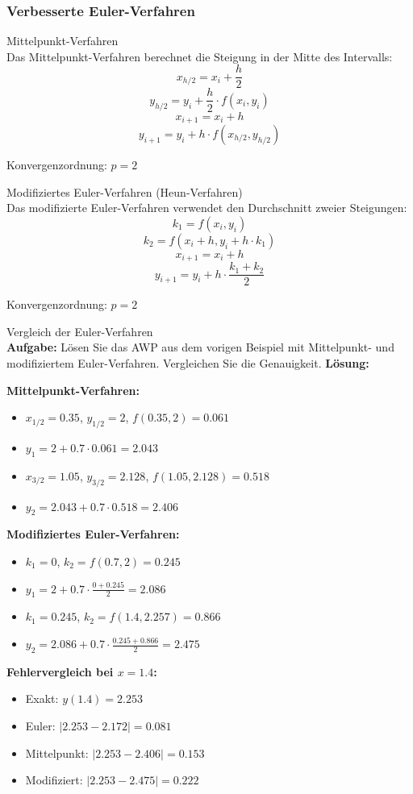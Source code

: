 \subsubsection{Verbesserte Euler-Verfahren}

\begin{theorem}{Mittelpunkt-Verfahren}\\
Das Mittelpunkt-Verfahren berechnet die Steigung in der Mitte des Intervalls:
$$x_{h/2} = x_i + \frac{h}{2}$$
$$y_{h/2} = y_i + \frac{h}{2} \cdot f(x_i, y_i)$$
$$x_{i+1} = x_i + h$$
$$y_{i+1} = y_i + h \cdot f(x_{h/2}, y_{h/2})$$

Konvergenzordnung: $p = 2$
\end{theorem}

\begin{theorem}{Modifiziertes Euler-Verfahren (Heun-Verfahren)}\\
Das modifizierte Euler-Verfahren verwendet den Durchschnitt zweier Steigungen:
$$k_1 = f(x_i, y_i)$$
$$k_2 = f(x_i + h, y_i + h \cdot k_1)$$
$$x_{i+1} = x_i + h$$
$$y_{i+1} = y_i + h \cdot \frac{k_1 + k_2}{2}$$

Konvergenzordnung: $p = 2$
\end{theorem}

\begin{example2}{Vergleich der Euler-Verfahren}\\
\textbf{Aufgabe:} Lösen Sie das AWP aus dem vorigen Beispiel mit Mittelpunkt- und modifiziertem Euler-Verfahren. Vergleichen Sie die Genauigkeit.
\tcblower
\textbf{Lösung:}

\textbf{Mittelpunkt-Verfahren:}
\begin{itemize}
    \item $x_{1/2} = 0.35$, $y_{1/2} = 2$, $f(0.35, 2) = 0.061$
    \item $y_1 = 2 + 0.7 \cdot 0.061 = 2.043$
    \item $x_{3/2} = 1.05$, $y_{3/2} = 2.128$, $f(1.05, 2.128) = 0.518$
    \item $y_2 = 2.043 + 0.7 \cdot 0.518 = 2.406$
\end{itemize}

\textbf{Modifiziertes Euler-Verfahren:}
\begin{itemize}
    \item $k_1 = 0$, $k_2 = f(0.7, 2) = 0.245$
    \item $y_1 = 2 + 0.7 \cdot \frac{0 + 0.245}{2} = 2.086$
    \item $k_1 = 0.245$, $k_2 = f(1.4, 2.257) = 0.866$
    \item $y_2 = 2.086 + 0.7 \cdot \frac{0.245 + 0.866}{2} = 2.475$
\end{itemize}

\textbf{Fehlervergleich bei $x = 1.4$:}
\begin{itemize}
    \item Exakt: $y(1.4) = 2.253$
    \item Euler: $|2.253 - 2.172| = 0.081$
    \item Mittelpunkt: $|2.253 - 2.406| = 0.153$
    \item Modifiziert: $|2.253 - 2.475| = 0.222$
\end{itemize}
\end{example2}


